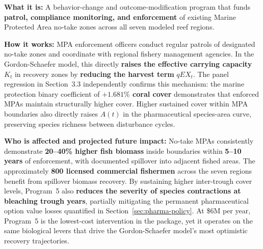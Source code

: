 \documentclass[10pt,letterpaper]{article}
\begin{document}
\begin{tcolorbox}[title=Program 5: MPA Monitoring Services --- \$6M Annual Total,
  colback=violet!5, colframe=violet!60!black, fonttitle=\bfseries, breakable]

  \textbf{What it is:} A behavior-change and outcome-modification program that funds \textbf{patrol, compliance monitoring, and enforcement} of existing Marine Protected Area no-take zones across all seven modeled reef regions.

  \medskip
  \textbf{How it works:} MPA enforcement officers conduct regular patrols of designated no-take zones and coordinate with regional fishery management agencies. In the Gordon-Schaefer model, this directly \textbf{raises the effective carrying capacity} $K_t$ in recovery zones by \textbf{reducing the harvest term} $qEX_t$. The panel regression in Section~3.3 independently confirms this mechanism: the marine protection binary coefficient of \textbf{$+1.681\%$ coral cover} demonstrates that enforced MPAs maintain structurally higher cover. Higher sustained cover within MPA boundaries also directly raises $A(t)$ in the pharmaceutical species-area curve, preserving species richness between disturbance cycles.

  \medskip
  \textbf{Who is affected and projected future impact:} No-take MPAs consistently demonstrate \textbf{20--40\% higher fish biomass} inside boundaries within \textbf{5--10 years} of enforcement, with documented spillover into adjacent fished areas. The approximately \textbf{800 licensed commercial fishermen} across the seven regions benefit from spillover biomass recovery. By sustaining higher inter-trough cover levels, Program~5 also \textbf{reduces the severity of species contractions at bleaching trough years}, partially mitigating the permanent pharmaceutical option value losses quantified in Section~\ref{sec:pharma-policy}. At \$6M per year, Program~5 is the lowest-cost intervention in the package, yet it operates on the same biological levers that drive the Gordon-Schaefer model's most optimistic recovery trajectories.
\end{tcolorbox}

\medskip
\end{document}
